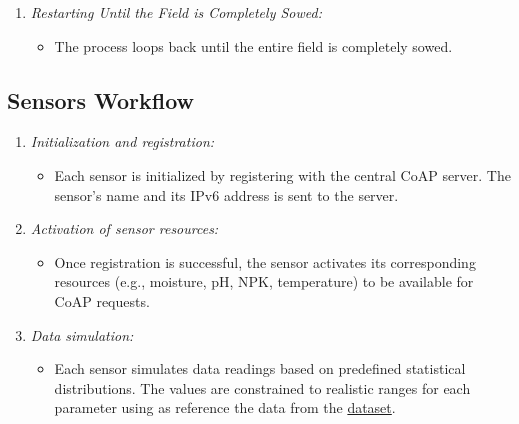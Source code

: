 \begin{enumerate}
    \item \textit{Restarting Until the Field is Completely Sowed:}
          \begin{itemize}
              \item The process loops back until the entire field is completely sowed.
          \end{itemize}

\end{enumerate}

\newpage




\subsection{Sensors Workflow}

\begin{enumerate}
    \item \textit{Initialization and registration:}
          \begin{itemize}
              \item Each sensor is initialized by registering with the central CoAP server. The sensor's name and its IPv6 address is sent to the server.
          \end{itemize}

    \item \textit{Activation of sensor resources:}
          \begin{itemize}
              \item Once registration is successful, the sensor activates its corresponding resources (e.g., moisture, pH, NPK, temperature) to be available for CoAP requests.
          \end{itemize}

    \item \textit{Data simulation:}
          \begin{itemize}
              \item Each sensor simulates data readings based on predefined statistical distributions. The values are constrained to realistic ranges for each parameter using as reference the data from the \href{https://www.kaggle.com/code/mdshariaremonshaikat/optimizing-agricultural-production-with-7-ml-model/input}{dataset}.
          \end{itemize}


\end{enumerate}
